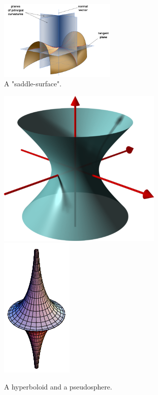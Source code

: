 \begin{figure}[h]
\centering
\includegraphics[width=0.5\textwidth]{Fig31}
\caption{A "saddle-surface".} 
\end{figure}

\begin{figure}[h]
\centering
\includegraphics[scale=0.5]{Fig41}
\includegraphics[scale=0.5]{Fig42}
\caption{A hyperboloid and a pseudosphere.} 
\end{figure}

